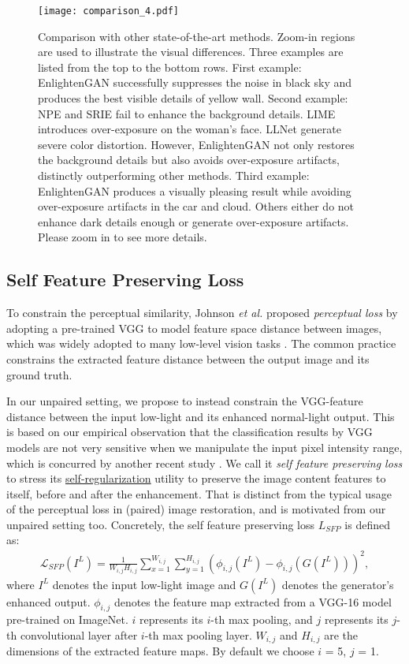 \documentclass[journal]{IEEEtran}
\begin{document}
\begin{figure*}[!ht]
\centering
\texttt{[image: comparison\_4.pdf]}
\caption{Comparison with other state-of-the-art methods. Zoom-in regions are used to illustrate the visual differences. Three examples are listed from the top to the bottom rows. First example: EnlightenGAN successfully suppresses the noise in black sky and produces the best visible details of yellow wall. Second example: NPE and SRIE fail to enhance the background details. LIME introduces over-exposure on the woman's face. LLNet generate severe color distortion. However, EnlightenGAN not only restores the background details but also avoids over-exposure artifacts, distinctly outperforming other methods. Third example: EnlightenGAN produces a visually pleasing result while avoiding over-exposure artifacts in the car and cloud. Others either do not enhance dark details enough or generate over-exposure artifacts. Please zoom in to see more details.}
\label{fig:comparison}
\end{figure*}


\subsection{Self Feature Preserving Loss}
To constrain the perceptual similarity, Johnson \textit{et al.} \cite{johnson2016perceptual} proposed \textit{perceptual loss} by adopting a pre-trained VGG to model feature space distance between images, which was widely adopted to many low-level vision tasks \cite{ledig2017photo,kupyn2017deblurgan}. The common practice constrains the extracted feature distance between the output image and its ground truth. 

In our unpaired setting, we propose to instead constrain the VGG-feature distance between the input low-light and its enhanced normal-light output. This is based on our empirical observation that the classification results by VGG models are not very sensitive when we manipulate the input pixel intensity range, which is concurred by another recent study \cite{richardwebster2018psyphy}. We call it \textit{self feature preserving loss} to stress its \underline{self-regularization} utility to preserve the image content features to itself, before and after the enhancement. That is distinct from the typical usage of the perceptual loss in (paired) image restoration, and is motivated from our unpaired setting too.
Concretely, the self feature preserving loss $L_{SFP}$ is defined as:
\begin{multline}
    \mathcal{L}_{SFP}(I^{L}) = \frac{1}{W_{i,j}H_{i,j}}\sum_{x=1}^{W_{i,j}}\sum_{y=1}^{H_{i,j}}(\phi_{i,j}(I^{L}) 
    - \phi_{i,j}(G(I^{L})))^2,
\end{multline}
where $I^{L}$ denotes the input low-light image and $G(I^{L})$ denotes the generator's enhanced output. $\phi_{i,j}$ denotes the feature map extracted from a VGG-16 model pre-trained on ImageNet. $i$ represents its $i$-th max pooling, and $j$ represents its $j$-th convolutional layer after $i$-th max pooling layer. $W_{i,j}$ and $H_{i,j}$ are the dimensions of the extracted feature maps. By default we choose $i$ = 5, $j$ = 1.
\end{document}
